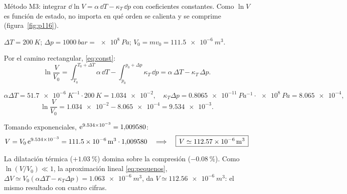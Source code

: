 \begin{resolucion}
\idea Método M3: integrar $\dd\ln V=\alpha\,\dd T-\kappa_T\,\dd p$ con coeficientes constantes. Como
$\ln V$ es función de estado, no importa en qué orden se calienta y se comprime (figura~\ref{fig:p116}).

 $\Delta T=\SI{200}{K}$; $\Delta p=\SI{1000}{bar}=\SI{e8}{Pa}$;
$V_0=mv_0=\SI{111,5e-6}{m^3}$.

 Por el camino rectangular, \eqref{eq:const}:
\[
  \ln\frac{V}{V_0}=\int_{T_0}^{T_0+\Delta T}\alpha\,\dd T-\int_{p_0}^{p_0+\Delta p}\kappa_T\,\dd p=\alpha\,\Delta T-\kappa_T\,\Delta p.
\]

\[
  \alpha\Delta T=\SI{51,7e-6}{K^{-1}}\cdot\SI{200}{K}=\num{1,034e-2},\quad
  \kappa_T\Delta p=\SI{0,8065e-11}{Pa^{-1}}\cdot\SI{e8}{Pa}=\num{8,065e-4},
\]
\[
  \ln\frac{V}{V_0}=\num{1,034e-2}-\num{8,065e-4}=\num{9,534e-3}.
\]

 Tomando exponenciales, $\mathrm{e}^{\num{9,534e-3}}=1{,}009580$:
\[
  V=V_0\,\mathrm{e}^{\num{9,534e-3}}=\SI{111,5e-6}{m^3}\cdot1{,}009580\quad\Longrightarrow\quad
  \boxed{\,V\simeq\SI{112,57e-6}{m^3}\,}
\]
\end{resolucion}

\begin{observacion}
La dilatación térmica ($+\SI{1,03}{\percent}$) domina sobre la compresión ($-\SI{0,08}{\percent}$). Como
$\ln(V/V_0)\ll1$, la aproximación lineal \eqref{eq:pequenos},
$\Delta V\simeq V_0(\alpha\Delta T-\kappa_T\Delta p)=\SI{1,063e-6}{m^3}$, da $V\simeq\SI{112,56e-6}{m^3}$: el
mismo resultado con cuatro cifras.
\end{observacion}

